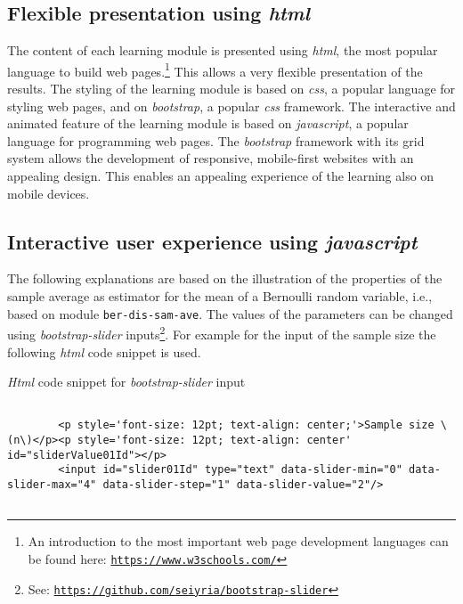 \documentclass{article}
\begin{document}
\subsection{Flexible presentation using \emph{html}}

The content of each learning module is presented using \emph{html}, the most popular language to build web pages.\footnote{An introduction to the most important web page development languages can be found here: \href{https://www.w3schools.com/}{\texttt{https://www.w3schools.com/}}} 
%
This allows a very flexible presentation of the results. 
%
The styling of the learning module is based on \emph{css}, a popular language for styling web pages, and on \emph{bootstrap}, a popular \emph{css} framework. 
%
The interactive and animated feature of the learning module is based on \emph{javascript}, a popular language for programming web pages. 
%
The \emph{bootstrap} framework with its grid system allows the development of responsive, mobile-first websites with an appealing design. 
%
This enables an appealing experience of the learning also on mobile devices.



\subsection{Interactive user experience using \emph{javascript}}

The following explanations are based on the illustration of the properties of the sample average as estimator for the mean of a Bernoulli random variable, i.e., based on module \texttt{ber-dis-sam-ave}. 
%
The values of the parameters can be changed using \emph{bootstrap-slider} inputs\footnote{See: \href{https://github.com/seiyria/bootstrap-slider}{\texttt{https://github.com/seiyria/bootstrap-slider}}}.
%
For example for the input of the sample size the following \emph{html} code snippet is used. 

\begin{CodeSnippet}[!hp]
	\centering
	\caption{\emph{Html} code snippet for \emph{bootstrap-slider} input}
	\tiny
	\vspace{0.25cm}
	\begin{BVerbatim}
		
		<p style='font-size: 12pt; text-align: center;'>Sample size \(n\)</p><p style='font-size: 12pt; text-align: center' id="sliderValue01Id"></p>
		<input id="slider01Id" type="text" data-slider-min="0" data-slider-max="4" data-slider-step="1" data-slider-value="2"/>
		
	\end{BVerbatim}
	\label{HtmlCodSniBsInput}
\end{CodeSnippet}
\end{document}

